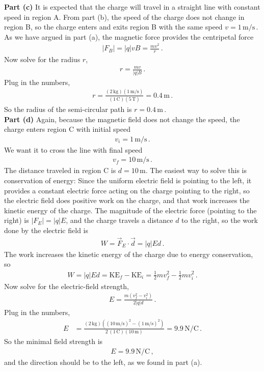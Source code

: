 \documentclass[11pt]{article}
\begin{document}
\noindent\textbf{Part (c)} It is expected that the charge will travel in a straight line with constant speed in region A. From part (b), the speed of the charge does not change in region B, so the charge enters and exits region B with the same speed $v=1\,\text{m/s}\,.$ As we have argued in part (a), the magnetic force provides the centripetal force
\begin{align*}
|F_B| =|q|vB=\frac{mv^2}{r}\,.
\end{align*}
Now solve for the radius $r$,
\begin{align*}
r=\frac{mv}{|q|B}\,.
\end{align*}
Plug in the numbers,
\begin{align*}
r=\frac{(2\,\text{kg})(1\,\text{m/s})}{(1\,\text{C})(5\,\text{T})}
=0.4\,\text{m}\,.
\end{align*}
So the radius of the semi-circular path is
$r=0.4\,\text{m}\,.$\\

\noindent\textbf{Part (d)} Again, because the magnetic field does not change the speed, the charge enters region C with initial speed
\begin{align*}
v_i=1\,\text{m/s}\,.
\end{align*}
We want it to cross the line with final speed
\begin{align*}
v_f=10\,\text{m/s}\,.
\end{align*}
The distance traveled in region C is $d=10\,$m. The easiest way to solve this is conservation of energy: Since the uniform electric field is pointing to the left, it provides a constant electric force acting on the charge pointing to the right, so the electric field does positive work on the charge, and that work increases the kinetic energy of the charge. The magnitude of the electric force (pointing to the right) is $|F_E|=|q|E$, and the charge travels a distance $d$ to the right, so the work done by the electric field is
\begin{align*}
W=\vec{F}_E\cdot\vec{d}=|q|Ed\,.
\end{align*}
The work increases the kinetic energy of the charge due to energy conservation, so
\begin{align*}
W = |q|Ed=\text{KE}_f-\text{KE}_i
=\frac{1}{2}mv_f^2-\frac{1}{2}mv_i^2\,.
\end{align*}
Now solve for the electric-field strength,
\begin{align*}
E=\frac{m(v_f^2-v_i^2)}{2|q|d}\,.
\end{align*}
Plug in the numbers,
\begin{align*}
E&=\frac{(2\,\text{kg})\left((10\,\text{m/s})^2-(1\,\text{m/s})^2\right)}{2\,(1\,\text{C})(10\,\text{m})}
=9.9\,\text{N/C}\,.
\end{align*}
So the minimal field strength is
\begin{align*}
E=9.9\,\text{N/C}\,,
\end{align*}
and the direction should be to the left, as we found in part (a).\\
\end{document}
